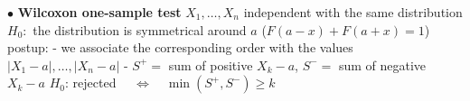 \documentclass[twoside]{book}
\begin{document}
\pagestyle{empty}

\def\dr #1{\par\noindent $\bullet$ {\bf #1}}


\dr{Wilcoxon one-sample test}
\vspace*{2mm}
\newline $X_1,\dots,X_n$ independent with the same distribution
\newline $H_0:$ the distribution is symmetrical around $a$ ($F(a-x)+F(a+x)=1$)
\newline
postup:
\newline - we associate the corresponding order with the values $|X_1-a|,\dots, |X_n-a|$
\newline - $S^{+}=$ sum of positive $X_k-a$, $S^{-}=$ sum of negative $X_k-a$
\newline $H_0$:  rejected $\quad\Longleftrightarrow\quad \min(S^{+},S^{-}) \geq k$
\end{document}
